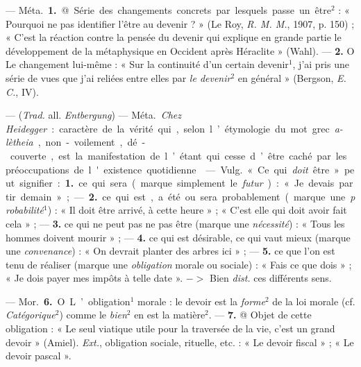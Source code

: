 \begin{itemize}[leftmargin=1cm, label=, itemsep=1pt]
 — \si{Méta.} {\bf 1.} @ Série des changements concrets par lesquels passe
un être$^2$ : « Pourquoi ne pas identifier l’être au devenir ? » (Le Roy,
{\it R. M. M.}, 1907, p. 150) ; « C’est la
réaction contre la pensée du devenir
qui explique en grande partie le
développement de la métaphysique
en Occident après Héraclite »
(Wahl). — {\bf 2.} O Le changement lui-même : « Sur la continuité d’un certain devenir$^1$, j'ai pris une série de
vues que j'ai reliées entre elles par
{\it le devenir}$^2$ en général » (Bergson,
{\it E. C.}, IV).

 — ({\it Trad.} all. {\it Entbergung})
— \si{Méta.} {\it Chez Heidegger} : caractère
de la vérité qui, selon l’étymologie
du mot grec {\it a-lètheia}, non-voilement, dé-couverte, est la manifestation de l’étant qui cesse d’être
caché par les préoccupations de
l'existence quotidienne.

 — \si{Vulg.} « Ce qui {\it doit}
être » peut signifier : {\bf 1.} ce qui sera
(marque simplement le {\it futur}) : « Je
devais partir demain » ; — {\bf 2.} ce qui
est, a été ou sera probablement
(marque une {\it probabilité}$^1$) : « Il doit
être arrivé, à cette heure » ; « C’est
elle qui doit avoir fait cela » ; — {\bf 3.} ce
qui ne peut pas ne pas être (marque
une {\it nécessité}) : « Tous les hommes
doivent mourir » ; — {\bf 4.} ce qui est
désirable, ce qui vaut mieux (marque
une {\it convenance}) : « On devrait
planter des arbres ici » ; — {\bf 5.} ce que
l’on est tenu de réaliser (marque une
{\it obligation} morale ou sociale) : « Fais
ce que dois » ; « Je dois payer mes
impôts à telle date ». $->$ Bien {\it dist.}
ces différents sens.

 — \si{Mor.} {\bf 6.} O L’obligation$^1$ morale : le devoir est la {\it forme}$^2$
de la loi morale (cf. {\it Catégorique}$^2$)
comme le {\it bien}$^2$ en est la matière$^2$. —
 {\bf 7.} @ Objet de cette obligation : « Le
seul viatique utile pour la traversée
de la vie, c’est un grand devoir »
(Amiel). {\it Ext.}, obligation sociale,
rituelle, etc. : « Le devoir fiscal » ;
« Le devoir pascal ».


\end{itemize}

